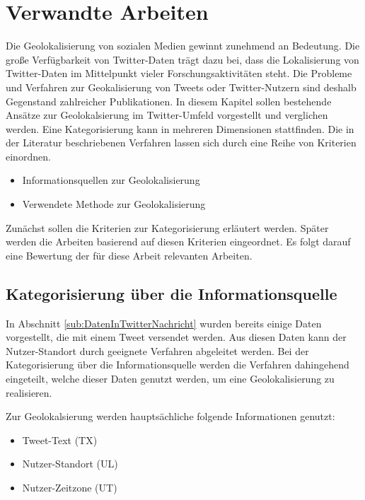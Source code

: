 \chapter{Verwandte Arbeiten} \label{chap:VerwandteArbeiten} 

	Die Geolokalisierung von sozialen Medien gewinnt zunehmend an Bedeutung. 
	Die große Verfügbarkeit von Twitter-Daten trägt dazu bei, dass die Lokalisierung von Twitter-Daten im Mittelpunkt vieler Forschungsaktivitäten steht. 
	Die Probleme und Verfahren zur Geokalisierung von Tweets oder Twitter-Nutzern sind deshalb Gegenstand zahlreicher Publikationen. 
	In diesem Kapitel sollen bestehende Ansätze zur Geolokalsierung im Twitter-Umfeld vorgestellt und verglichen werden. 
	Eine Kategorisierung kann in mehreren Dimensionen stattfinden.
	Die in der Literatur beschriebenen Verfahren lassen sich durch eine Reihe von Kriterien einordnen.

	\begin{itemize}
		\item Informationsquellen zur Geolokalisierung
		\item Verwendete Methode zur Geolokalisierung
	\end{itemize}

	Zunächst sollen die Kriterien zur Kategorisierung erläutert werden.
	Später werden die Arbeiten basierend auf diesen Kriterien eingeordnet.
	Es folgt darauf eine Bewertung der für diese Arbeit relevanten Arbeiten.

	\section{Kategorisierung über die Informationsquelle}
		
			In Abschnitt \ref{sub:DatenInTwitterNachricht} wurden bereits einige Daten vorgestellt, die mit einem Tweet versendet werden. 
			Aus diesen Daten kann der Nutzer-Standort durch geeignete Verfahren abgeleitet werden. 
			Bei der Kategorisierung über die Informationsquelle werden die Verfahren dahingehend eingeteilt, welche dieser Daten genutzt werden, um eine Geolokalisierung zu realisieren.

			Zur Geolokalsierung werden hauptsächliche folgende Informationen genutzt:

			\begin{itemize}
				\item Tweet-Text (TX)
				\item Nutzer-Standort (UL)
				\item Nutzer-Zeitzone (UT)
			\end{itemize}

